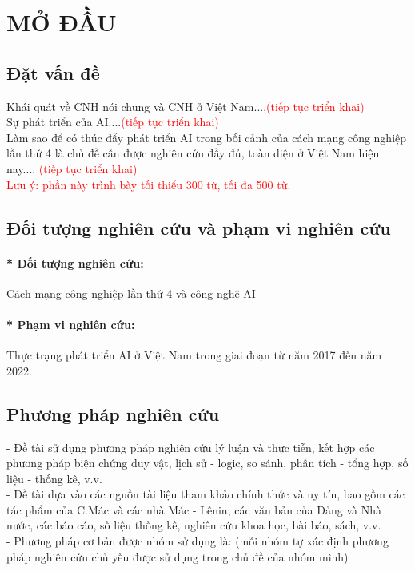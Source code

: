 \documentclass{report}
\newcommand{\gachdau}{\hspace*{1.5em}\ignorespaces} %
\begin{document}
\tableofcontents
\clearpage
\chapter{MỞ ĐẦU}
\section{Đặt vấn đề}
\gachdau
Khái quát về CNH nói chung và CNH ở Việt Nam....\textcolor{red}{(tiếp tục triển khai)}\\
\gachdau
Sự phát triển của AI....\textcolor{red}{(tiếp tục triển khai)}\\
\gachdau
Làm sao để có thúc đẩy phát triển AI trong bối cảnh của cách mạng công nghiệp lần thứ 4  là chủ đề cần được nghiên cứu đầy đủ, toàn diện ở Việt Nam hiện nay.... \textcolor{red}{(tiếp tục triển khai)}\\
\gachdau
\textcolor{red}{Lưu ý: phần này trình bày tối thiểu 300 từ, tối đa 500 từ.}\\

\section{Đối tượng nghiên cứu và phạm vi nghiên cứu}
\subsubsection{* Đối tượng nghiên cứu:}
\gachdau
Cách mạng công nghiệp lần thứ 4 và công nghệ AI
\subsubsection{* Phạm vi nghiên cứu:}
\gachdau
Thực trạng phát triển AI ở Việt Nam trong giai đoạn từ năm 2017 đến năm 2022.
\section{Phương pháp nghiên cứu}
\gachdau
- Đề tài sử dụng phương pháp nghiên cứu lý luận và thực tiễn, kết hợp các phương pháp biện chứng duy vật, lịch sử - logic, so sánh, phân tích - tổng hợp, số liệu - thống kê, v.v.\\
\gachdau
- Đề tài dựa vào các nguồn tài liệu tham khảo chính thức và uy tín, bao gồm các tác phẩm của C.Mác và các nhà Mác - Lênin, các văn bản của Đảng và Nhà nước, các báo cáo, số liệu thống kê, nghiên cứu khoa học, bài báo, sách, v.v.\\
\gachdau
- Phương pháp cơ bản được nhóm sử dụng là: (mỗi nhóm tự xác định phương pháp nghiên cứu chủ yếu được sử dụng trong chủ đề của nhóm mình)
\end{document}
